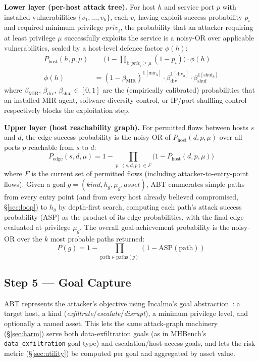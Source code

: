 \documentclass[conference]{IEEEtran}
\begin{document}
\textbf{Lower layer (per-host attack tree).} For host $h$ and service port $p$ with
installed vulnerabilities $\{v_1,\dots,v_k\}$, each $v_i$ having exploit-success
probability $p_i$ and required minimum privilege $\mathit{priv}_i$, the probability
that an attacker requiring at least privilege $\mu$ successfully exploits the service
is a noisy-OR over applicable vulnerabilities, scaled by a host-level defence factor
$\phi(h)$:
\begin{align}
P_{\mathrm{host}}(h,p,\mu) &= \Big(1-\!\!\!\prod_{i:\ \mathit{priv}_i\ge\mu}\!\!\!(1-p_i)\Big)\cdot\phi(h) \label{eq:hostp}\\
\phi(h) &= (1-\beta_{\mathrm{MIR}})^{\mathbb{1}[\mathrm{mir}_h]}\cdot
            \beta_{\mathrm{div}}^{\mathbb{1}[\mathrm{div}_h]}\cdot
            \beta_{\mathrm{shuf}}^{\mathbb{1}[\mathrm{shuf}_h]} \label{eq:phi}
\end{align}
where $\beta_{\mathrm{MIR}}$, $\beta_{\mathrm{div}}$, $\beta_{\mathrm{shuf}}\in[0,1]$
are the (empirically calibrated) probabilities that an installed MIR agent,
software-diversity control, or IP/port-shuffling control respectively blocks the
exploitation step.

\textbf{Upper layer (host reachability graph).} For permitted flows between hosts
$s$ and $d$, the edge success probability is the noisy-OR of
$P_{\mathrm{host}}(d,p,\mu)$ over all ports $p$ reachable from $s$ to $d$:
\[
P_{\mathrm{edge}}(s,d,\mu) = 1-\prod_{p:\,(s,d,p)\in F} \big(1-P_{\mathrm{host}}(d,p,\mu)\big)
\]
where $F$ is the current set of permitted flows (including attacker-to-entry-point
flows). Given a goal $g=(\mathit{kind}, h_g, \mu_g, \mathit{asset})$, ABT enumerates
simple paths from every entry point (and from every host already believed
compromised, \S\ref{sec:loop}) to $h_g$ by depth-first search, computing each path's
attack success probability (ASP) as the product of its edge probabilities, with the
final edge evaluated at privilege $\mu_g$. The overall goal-achievement probability
is the noisy-OR over the $k$ most probable paths returned:
\[
P(g) = 1-\prod_{\text{path}\in\mathrm{paths}(g)}(1-\mathrm{ASP}(\text{path}))
\]

\subsection{Step 5 --- Goal Capture}
\label{sec:goal}

ABT represents the attacker's objective using Incalmo's goal
abstraction~\cite{incalmo2025}: a target host, a kind
(\emph{exfiltrate}/\emph{escalate}/\emph{disrupt}), a minimum privilege level, and
optionally a named asset. This lets the same attack-graph machinery
(\S\ref{sec:harm}) serve both data-exfiltration goals (as in MHBench's
\texttt{data\_exfiltration} goal type) and escalation/host-access goals, and lets the
risk metric (\S\ref{sec:utility}) be computed per goal and aggregated by asset value.
\end{document}
